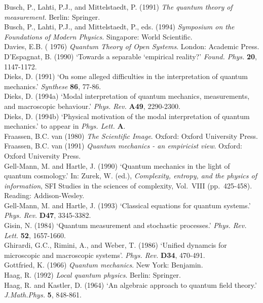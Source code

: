 \documentclass[12pt,titlepage]{article}
\begin{document}
 Busch,  P., Lahti,  P.J., and Mittelstaedt,  P.  (1991) {\em The quantum
theory of measurement}.
 Berlin: Springer.\\
 Busch,  P., Lahti,  P.J., and Mittelstaedt,  P.,  eds.  (1994)
{\em Symposium on the Foundations of Modern Physics.}
Singapore: World Scientific.\\
Davies, E.B. ( 1976) {\em Quantum Theory of Open Systems}.
London: Academic Press. \\
  D'Espagnat, B. (1990) `Towards a separable `empirical reality?' {\em Found.
Phys.} {\bf 20},
1147-1172.\\
 Dieks, D. (1991) `On some alleged difficulties in the interpretation of
quantum mechanics.'
{\em Synthese} {\bf 86},  77-86.\\
  Dieks, D. (1994a) `Modal interpretation of quantum mechanics, measurements,
and macroscopic
behaviour.'  {\em Phys. Rev.} {\bf A49}, 2290-2300.\\
  Dieks, D. (1994b)  `Physical motivation of the modal interpretation of
quantum mechanics.' to
appear in {\em Phys. Lett.} {\bf A}.\\
   Fraassen, B.C. van (1980) {\em The Scientific Image}.  Oxford:
 Oxford University Press. \\
 Fraassen, B.C. van  (1991) {\em Quantum mechanics - an empiricist view}.
Oxford: Oxford
University Press.\\
Gell-Mann, M.  and  Hartle, J. (1990)  `Quantum mechanics in the light of
quantum
cosmology.' In: Zurek, W. (ed.), {\em Complexity, entropy, and the physics of
information}, SFI
Studies in the sciences of complexity, Vol.\ VIII (pp.\ 425-458).    Reading:
Addison-Wesley.\\
 Gell-Mann, M.  and  Hartle, J. (1993)  `Classical equations for quantum
systems.' {\em Phys. Rev.}
{\bf D47}, 3345-3382.\\
  Gisin, N. (1984)  `Quantum
measurement and stochastic processes.' {\em Phys. Rev. Lett.} {\bf 52},
1657-1660.\\
  Ghirardi, G.C.,  Rimini,  A., and Weber, T. (1986) `Unified dynamcis for
microscopic and
macroscopic systems'. {\em Phys. Rev.} {\bf D34},  470-491.\\
 Gottfried, K. (1966) {\em Quantum mechanics}.  New York: Benjamin.\\
 Haag, R. (1992) {\em Local quantum
physics}. Berlin: Springer.\\
 Haag, R. and  Kastler, D. (1964)  `An algebraic approach to
quantum field theory.'   {\em J.Math.Phys.} {\bf 5}, 848-861.\\
\end{document}
